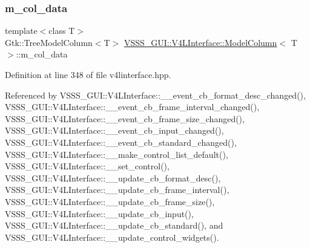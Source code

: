 \subsubsection{\texorpdfstring{m\+\_\+col\+\_\+data}{m\_col\_data}}
{\footnotesize\ttfamily template$<$class T$>$ \\
Gtk\+::\+Tree\+Model\+Column$<$T$>$ \hyperlink{class_v_s_s_s___g_u_i_1_1_v4_l_interface_1_1_model_column}{V\+S\+S\+S\+\_\+\+G\+U\+I\+::\+V4\+L\+Interface\+::\+Model\+Column}$<$ T $>$\+::m\+\_\+col\+\_\+data}



Definition at line 348 of file v4linterface.\+hpp.



Referenced by V\+S\+S\+S\+\_\+\+G\+U\+I\+::\+V4\+L\+Interface\+::\+\_\+\+\_\+event\+\_\+cb\+\_\+format\+\_\+desc\+\_\+changed(), V\+S\+S\+S\+\_\+\+G\+U\+I\+::\+V4\+L\+Interface\+::\+\_\+\+\_\+event\+\_\+cb\+\_\+frame\+\_\+interval\+\_\+changed(), V\+S\+S\+S\+\_\+\+G\+U\+I\+::\+V4\+L\+Interface\+::\+\_\+\+\_\+event\+\_\+cb\+\_\+frame\+\_\+size\+\_\+changed(), V\+S\+S\+S\+\_\+\+G\+U\+I\+::\+V4\+L\+Interface\+::\+\_\+\+\_\+event\+\_\+cb\+\_\+input\+\_\+changed(), V\+S\+S\+S\+\_\+\+G\+U\+I\+::\+V4\+L\+Interface\+::\+\_\+\+\_\+event\+\_\+cb\+\_\+standard\+\_\+changed(), V\+S\+S\+S\+\_\+\+G\+U\+I\+::\+V4\+L\+Interface\+::\+\_\+\+\_\+make\+\_\+control\+\_\+list\+\_\+default(), V\+S\+S\+S\+\_\+\+G\+U\+I\+::\+V4\+L\+Interface\+::\+\_\+\+\_\+set\+\_\+control(), V\+S\+S\+S\+\_\+\+G\+U\+I\+::\+V4\+L\+Interface\+::\+\_\+\+\_\+update\+\_\+cb\+\_\+format\+\_\+desc(), V\+S\+S\+S\+\_\+\+G\+U\+I\+::\+V4\+L\+Interface\+::\+\_\+\+\_\+update\+\_\+cb\+\_\+frame\+\_\+interval(), V\+S\+S\+S\+\_\+\+G\+U\+I\+::\+V4\+L\+Interface\+::\+\_\+\+\_\+update\+\_\+cb\+\_\+frame\+\_\+size(), V\+S\+S\+S\+\_\+\+G\+U\+I\+::\+V4\+L\+Interface\+::\+\_\+\+\_\+update\+\_\+cb\+\_\+input(), V\+S\+S\+S\+\_\+\+G\+U\+I\+::\+V4\+L\+Interface\+::\+\_\+\+\_\+update\+\_\+cb\+\_\+standard(), and V\+S\+S\+S\+\_\+\+G\+U\+I\+::\+V4\+L\+Interface\+::\+\_\+\+\_\+update\+\_\+control\+\_\+widgets().

\mbox{\label{class_v_s_s_s___g_u_i_1_1_v4_l_interface_1_1_model_column_a96d5f652d19a139a1380d9ffc0110ed0}} 
